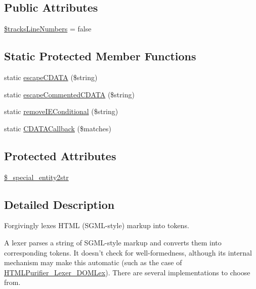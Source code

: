 \subsection*{Public Attributes}
\begin{DoxyCompactItemize}
\item 
\hyperlink{classHTMLPurifier__Lexer_acd246fb6f67bd3043b18553b04db93ed}{\$tracks\+Line\+Numbers} = false
\end{DoxyCompactItemize}
\subsection*{Static Protected Member Functions}
\begin{DoxyCompactItemize}
\item 
static \hyperlink{classHTMLPurifier__Lexer_a592d0852a8e007908b248dcd4647826d}{escape\+C\+D\+A\+T\+A} (\$string)
\item 
static \hyperlink{classHTMLPurifier__Lexer_ac79e709cfa5ece6d764bff90141005ee}{escape\+Commented\+C\+D\+A\+T\+A} (\$string)
\item 
static \hyperlink{classHTMLPurifier__Lexer_a8dfb1f0b3f5a080b48ad72b997dda049}{remove\+I\+E\+Conditional} (\$string)
\item 
static \hyperlink{classHTMLPurifier__Lexer_a58d8d2b2a37685a8855268ad4dec0c03}{C\+D\+A\+T\+A\+Callback} (\$matches)
\end{DoxyCompactItemize}
\subsection*{Protected Attributes}
\begin{DoxyCompactItemize}
\item 
\hyperlink{classHTMLPurifier__Lexer_af2dcc2daaa4671f1a4edefa53b0d022d}{\$\+\_\+special\+\_\+entity2str}
\end{DoxyCompactItemize}


\subsection{Detailed Description}
Forgivingly lexes H\+T\+M\+L (S\+G\+M\+L-\/style) markup into tokens.

A lexer parses a string of S\+G\+M\+L-\/style markup and converts them into corresponding tokens. It doesn't check for well-\/formedness, although its internal mechanism may make this automatic (such as the case of \hyperlink{classHTMLPurifier__Lexer__DOMLex}{H\+T\+M\+L\+Purifier\+\_\+\+Lexer\+\_\+\+D\+O\+M\+Lex}). There are several implementations to choose from.

